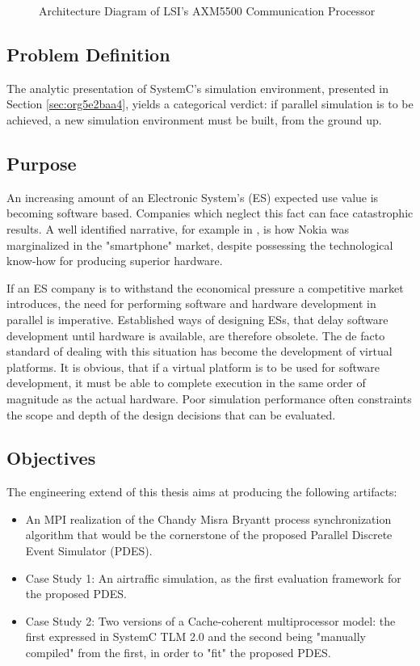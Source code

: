 \documentclass[11pt]{article}
\begin{document}
\begin{figure}[htpb]
\centering

\caption{Architecture Diagram of LSI's AXM5500 Communication Processor}
\label{fig:axm5500}
\end{figure}
\subsection{Problem Definition}
\label{sec:orgcfe1c46}
The analytic presentation of SystemC's simulation environment, 
presented in Section \ref{sec:org5e2baa4}, 
yields a categorical verdict: if parallel simulation is to be achieved, 
a new simulation environment must be built, from the ground up.

\subsection{Purpose}
\label{sec:orge491acd}
An increasing amount of an Electronic System's (ES) expected use value is becoming software based.
Companies which neglect this fact can face catastrophic results.
A well identified narrative, for example in \cite{Surowiecki2013}, 
is how Nokia was marginalized in the "smartphone" market, 
despite possessing the technological know-how for producing superior hardware.

If an ES company is to withstand the economical pressure a competitive market introduces, the need for performing software and hardware development in parallel is imperative.
Established ways of designing ESs, that delay software development until hardware is available, are therefore obsolete.
The de facto standard of dealing with this situation has become the development of virtual platforms.
It is obvious, that if a virtual platform is to be used for software development, it must be able to complete execution in the same order of magnitude as the actual hardware.
Poor simulation performance often constraints the scope and depth of the design decisions that can be evaluated.

\subsection{Objectives}
\label{sec:orgd090cc6}
The engineering extend of this thesis aims at producing the following artifacts:
\begin{itemize}
\item An MPI realization of the Chandy Misra Bryantt process synchronization algorithm that would be the cornerstone of the proposed Parallel Discrete Event Simulator (PDES).
\item Case Study 1: An airtraffic simulation, as the first evaluation framework for the proposed PDES.
\item Case Study 2: Two versions of a Cache-coherent multiprocessor model: the first expressed in SystemC TLM 2.0 and the second being "manually compiled" from the first, in order to "fit" the proposed PDES.
\end{itemize}
\end{document}
